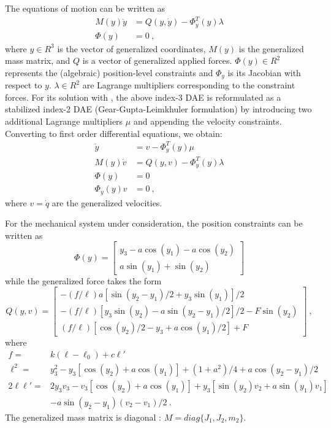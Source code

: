 The equations of motion can be written as
\begin{equation*}
  \begin{split}
    M(y) \ddot y &= Q(y,\dot y) - \Phi_y^T(y) \lambda \\
    \Phi(y)     &= 0 ~,
  \end{split}
\end{equation*}
where $y \in R^3$ is the vector of generalized coordinates, $M(y)$ is the generalized mass
matrix, and $Q$ is a vector of generalized applied forces. $\Phi(y) \in R^2$ represents the
(algebraic) position-level constraints and $\Phi_y$ is its Jacobian with respect to $y$.
$\lambda \in R^2$ are Lagrange multipliers corresponding to the constraint forces.
For its solution with {\idas}, the above index-3 DAE is reformulated as a stabilized 
index-2 DAE (Gear-Gupta-Leimkhuler formulation) by introducing two additional Lagrange 
multipliers $\mu$ and appending the velocity constraints.
Converting to first order differential equations, we obtain:
\begin{equation}\label{e:GGLform}
\begin{split}
  \dot y &= v - \Phi_y^T(y) \mu  \\
  M(y) \dot v &= Q(y,v) - \Phi_y^T(y) \lambda \\
  \Phi(y)     &= 0 \\
  \Phi_y(y) v &= 0 ~,
\end{split}
\end{equation}
where $v = \dot q$ are the generalized velocities.

For the mechanical system under consideration, the position constraints can be written as
\begin{equation*}
  \Phi(y) = \begin{bmatrix}
    y_3 - a \cos(y_1) - a \cos(y_2) \\
    a \sin(y_1) + \sin(y_2)
  \end{bmatrix}
\end{equation*}
while the generalized force takes the form
\begin{equation*}
  Q(y, v) = \begin{bmatrix}
    - (f/\ell) a [\sin(y_2-y_1)/2 + y_3 \sin(y_1)]/2 \\
    - (f/\ell) [ y_3 \sin(y_2) - a \sin(y_2-y_1)/2]/2 - F \sin(y_2) \\
    (f/\ell) [\cos(y_2)/2 - y_3 + a \cos(y_1)/2 ] + F
  \end{bmatrix} ~,
\end{equation*}
where
\begin{equation*}
  \begin{split}
    f = & k (\ell - \ell_0) + c {\ell}' \\
    \ell^2 = & y_3^2 - y_3 [\cos(y_2) + a \cos(y_1)] + (1 + a^2)/4 + a \cos(y_2-y_1)/2 \\
    2 \ell {\ell}' = & 2 y_3 v_3 - v_3 [\cos(y_2) + a \cos(y_1)] + y_3 [\sin(y_2)v_2 + a\sin(y_1)v_1] \\
    & - a \sin(y_2-y_1) (v_2-v_1)/2 ~.
  \end{split}
\end{equation*}
The generalized mass matrix is diagonal : $M = diag \{J_1, J_2, m_2\}$.

